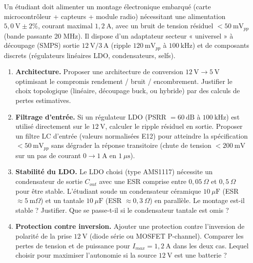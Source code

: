\documentclass[11pt]{article}
\begin{document}
\begin{exercice}
Un étudiant doit alimenter un montage électronique embarqué (carte microcontrôleur + capteurs + module radio) nécessitant une alimentation $5,0~\mathrm{V} \pm 2\%$, courant maximal $1,2~\mathrm{A}$, avec un bruit de tension résiduel $< 50~\mathrm{mV}_{pp}$ (bande passante 20 MHz). Il dispose d'un adaptateur secteur « universel » à découpage (SMPS) sortie $12~\mathrm{V} / 3~\mathrm{A}$ (ripple $120~\mathrm{mV}_{pp}$ à $100~\mathrm{kHz}$) et de composants discrets (régulateurs linéaires LDO, condensateurs, selfs).
\begin{enumerate}
    \item \textbf{Architecture.} Proposer une architecture de conversion $12~\mathrm{V} \to 5~\mathrm{V}$ optimisant le compromis rendement / bruit / encombrement. Justifier le choix topologique (linéaire, découpage buck, ou hybride) par des calculs de pertes estimatives.
    \item \textbf{Filtrage d'entrée.} Si un régulateur LDO (PSRR $= 60~\mathrm{dB}$ à $100~\mathrm{kHz}$) est utilisé directement sur le $12~\mathrm{V}$, calculer le ripple résiduel en sortie. Proposer un filtre LC d'entrée (valeurs normalisées E12) pour atteindre la spécification $< 50~\mathrm{mV}_{pp}$ sans dégrader la réponse transitoire (chute de tension $< 200~\mathrm{mV}$ sur un pas de courant $0 \to 1~\mathrm{A}$ en $1~\mu\mathrm{s}$).
    \item \textbf{Stabilité du LDO.} Le LDO choisi (type AMS1117) nécessite un condensateur de sortie $C_{out}$ avec une ESR comprise entre $0,05~\Omega$ et $0,5~\Omega$ pour être stable. L'étudiant soude un condensateur céramique $10~\mu\mathrm{F}$ (ESR $\approx 5~\mathrm{m}\Omega$) et un tantale $10~\mu\mathrm{F}$ (ESR $\approx 0,3~\Omega$) en parallèle. Le montage est-il stable ? Justifier. Que se passe-t-il si le condensateur tantale est omis ?
    \item \textbf{Protection contre inversion.} Ajouter une protection contre l'inversion de polarité de la prise $12~\mathrm{V}$ (diode série ou MOSFET P-channel). Comparer les pertes de tension et de puissance pour $I_{max} = 1,2~\mathrm{A}$ dans les deux cas. Lequel choisir pour maximiser l'autonomie si la source $12~\mathrm{V}$ est une batterie ?
\end{enumerate}
\end{exercice}
\end{document}
